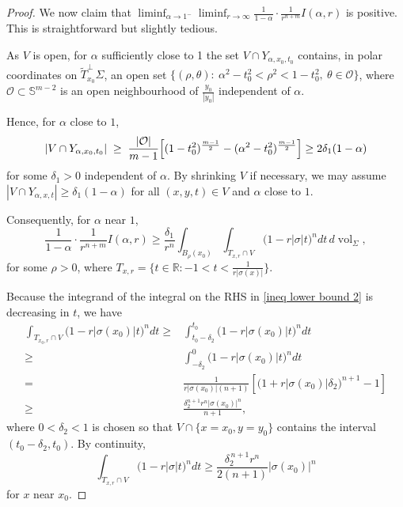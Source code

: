 \documentclass[11pt, reqno]{amsart}
\numberwithin{equation}{section}
\begin{document}
\begin{proof}
We now claim that $\displaystyle \liminf_{\alpha \to 1^{-}} \liminf_{r \to \infty} \frac{1}{1-\alpha}\cdot\frac{1}{r^{n+m}} I(\alpha, r)$ is positive. This is straightforward but slightly tedious.

As $V$ is open, for $\alpha$ sufficiently close to 1 the set $V \cap Y_{\alpha, x_0, t_0}$ contains, in polar coordinates on $\widetilde{T}_{x_0}^{\perp} \Sigma$, an open set
$\{(\rho, \theta):\ \alpha^{2}-t_{0}^{2}<\rho^{2}<1-t_{0}^{2}, \ \theta\in\mathcal O\}$,
where $\mathcal O\subset\mathbb S^{m-2}$ is an open neighbourhood of $\frac{y_{0}}{|y_{0}|}$ independent of $\alpha$.

Hence, for $\alpha$ close to $1$,
$$
|V\cap Y_{\alpha, x_{0}, t_{0}}|
\;\ge\;
\frac{|\mathcal O|}{m-1}\Bigl[(1-t_{0}^{2})^{\frac{m-1}{2}}-(\alpha^{2}-t_{0}^{2})^{\frac{m-1}{2}}\Bigr]
\ge2 \delta_1(1-\alpha)
$$
for some $\delta_{1}>0$ independent of $\alpha$. By shrinking $V$ if necessary, we may assume $|V\cap Y_{\alpha, x, t}|\ge\delta_{1}(1-\alpha)$ for all $(x, y, t)\in V$ and $\alpha$ close to $1$.

Consequently, for $\alpha$ near $1$,
\begin{equation}\label{ineq lower bound 2}
\frac{1}{1-\alpha}\cdot \frac{1}{r^{n+m}} I(\alpha, r) \ge \frac{\delta_{1}}{r^{n}}\int_{B_{\rho}(x_{0})} \int_{T_{x, r}\cap V} \bigl(1-r|\sigma| t\bigr)^{n}dt\, d\operatorname{vol}_{\Sigma},
\end{equation}
for some $\rho>0$, where $T_{x, r} =\{t\in \mathbb R: -1<t<\tfrac{1}{r|\sigma(x)|}\}$.

Because the integrand of the integral on the RHS in \eqref{ineq lower bound 2} is
decreasing in $t$, we have
\begin{equation}\label{ineq TV}
\begin{aligned}
\int_{T_{x_{0}, r} \cap V}
\bigl(1-r|\sigma(x_{0})| t\bigr)^{n} dt
\ge& \int_{ t_0 -\delta_{2}}^{ t_0 } \bigl(1-r|\sigma(x_{0})| t\bigr)^{n} dt \\
\ge& \int_{ -\delta_{2}}^{0} \bigl(1-r|\sigma(x_{0})| t\bigr)^{n} dt \\
=& \frac{1}{r|\sigma(x_{0})|(n+1)}
\left[\bigl(1+r|\sigma(x_{0})|\delta_{2}\bigr)^{n+1}-1\right]\\
\ge& \frac{\delta_2^{n+1}r^n|\sigma(x_0)|^{n}}{n+1},
\end{aligned}
\end{equation}
where $0<\delta_{2}<1$ is chosen so that $V \cap \{x=x_{0}, y=y_{0}\}$ contains the interval
$(t_{0}-\delta_{2}, t_{0})$.
By continuity,
$$
\int_{T_{x, r} \cap V}
\bigl(1-r|\sigma| t\bigr)^{n} dt
\ge\frac{\delta_{2}^{\, n+1} r^{n}}{2(n+1)} |\sigma(x_{0})|^{n}
$$
for $x$ near $x_{0}$.


\end{proof}
\end{document}
